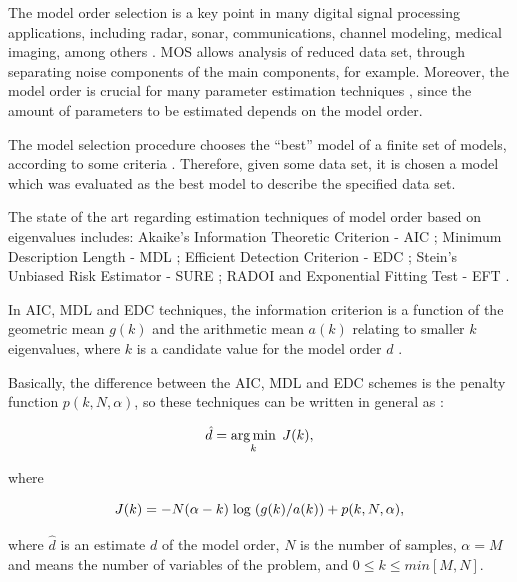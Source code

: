 The model order selection is a key point in many digital signal processing applications, including radar, sonar, communications, channel modeling, medical imaging, among others \cite{da2011subspace, da2011multi, xiong2017bayesian}. MOS allows analysis of reduced data set, through separating noise components of the main components, for example. Moreover, the model order is crucial for many parameter estimation techniques \cite{da2007enhanced, da2009comparison}, since the amount of parameters to be estimated depends on the model order.

The model selection procedure chooses the ``best'' model of a finite set of models, according to some criteria \cite{rajan1997model}. Therefore, given some data set, it is chosen a model which was evaluated as the best model to describe the specified data set.

The state of the art regarding estimation techniques of model order based on eigenvalues includes: Akaike's Information Theoretic Criterion - AIC \cite{akaike1974new,wax1985detection}; Minimum Description Length - MDL \cite{barron1998minimum,wax1985detection}; Efficient Detection Criterion - EDC \cite{zhao1986detection}; Stein's Unbiased Risk Estimator - SURE \cite{ulfarsson2008rank}; RADOI \cite{radoi2004new} and Exponential Fitting Test - EFT \cite{grouffaud1996some, quinlan2006model, david2011blind}.

In AIC, MDL and EDC techniques, the information criterion is a function of the geometric mean $g(k)$ and the arithmetic mean $a(k)$ relating to smaller $k$ eigenvalues, where $k$ is a candidate value for the model order $d$ \cite{da2009comparison}.

Basically, the difference between the AIC, MDL and EDC schemes is the penalty function $p(k, N, \alpha)$, so these techniques can be written in general as \cite{da2009comparison}:

\begin{equation}\label{eq:eq1}
  \hat{d} = \operatorname*{arg\,min}\limits_k \hspace{1 mm} J(k), 
\end{equation}

where

\begin{equation}\label{eq:eq2}
  J(k) = -N(\alpha - k) \hspace{1 mm} {\rm log} \hspace{1 mm} (g(k)/a(k)) + p(k,N,\alpha),
\end{equation}

where $\hat{d}$ is an estimate $d$ of the model order, $N$ is the number of samples, $\alpha = M$ and means the number of variables of the problem, and $0 \leqslant k \leqslant min[M, N]$. 


